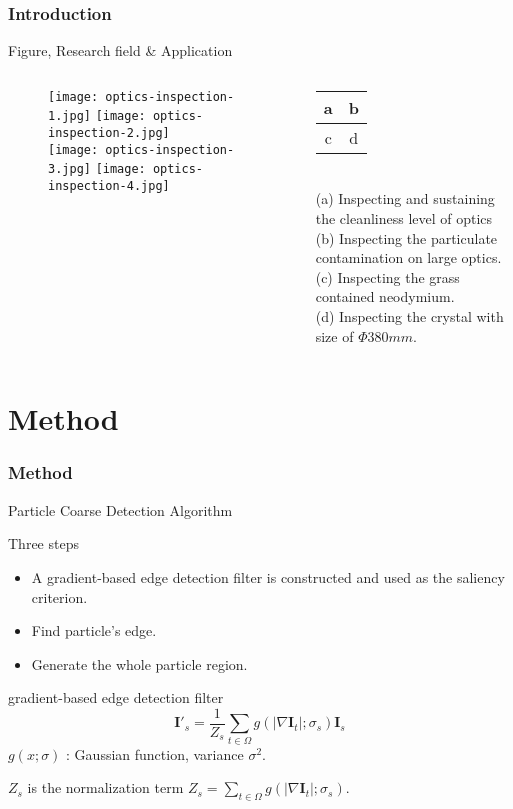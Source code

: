 \documentclass[14pt,hyperref={CJKbookmarks=true}]{beamer}
\theoremstyle{plain}
\theoremstyle{definition}
\theoremstyle{remark}
\begin{document}
\begin{frame}
\frametitle{Introduction}{Figure, Research field \& Application}
\begin{columns}[onlytextwidth]
\begin{column}{0.8\textwidth}
\begin{figure}[h]
\centering
\texttt{[image: optics-inspection-1.jpg]}
\texttt{[image: optics-inspection-2.jpg]}\\
\texttt{[image: optics-inspection-3.jpg]}
\texttt{[image: optics-inspection-4.jpg]}
\caption{
}
\end{figure}
\end{column}
\begin{column}{0.2\textwidth}
\tiny
\begin{tabular}{c|c}
a&b\\\hline
c&d
\end{tabular}\\
\scriptsize
(a) Inspecting and sustaining the cleanliness level of optics\\
(b) Inspecting the particulate contamination on large optics.\\
(c) Inspecting the grass contained neodymium.\\
(d) Inspecting the crystal with size of $\Phi380mm$.
\end{column}
\end{columns}
\end{frame}

\section{Method}

\begin{frame}
\small
\frametitle{Method}{Particle Coarse Detection Algorithm}
\begin{block}{Three steps}
\begin{itemize}
\item A gradient-based edge detection filter is constructed and used as the saliency criterion.
\item Find particle's edge.
\item Generate the whole particle region.
\end{itemize}
\end{block}

\begin{block}{gradient-based edge detection filter}
\begin{equation}\label{GradientImage}
  \mathbf{I}'_s = \frac{1}{Z_s}\sum_{t\in\Omega}g(|\nabla \mathbf{I}_t|;\sigma_s)\mathbf{I}_s
\end{equation}
\scriptsize
$g(x;\sigma)$ : Gaussian function, variance $\sigma^2$. 

$Z_s$ is the normalization term $Z_s = \sum_{t\in\Omega}g(|\nabla\mathbf{I}_t|;\sigma_s)$.
\end{block}
\end{frame}
\end{document}
